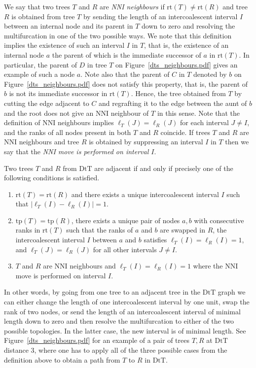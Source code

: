 \documentclass{amsart}
\newcommand{\mdts}{\mathrm{DtT}}
\newcommand{\rt}{\mathrm{rt}}
\newcommand{\tp}{\mathrm{tp}}
\begin{document}
We say that two trees $T$ and $R$ are {\em NNI neighbours} if $\rt(T) \ne \rt(R)$ and tree $R$ is obtained from tree $T$ by sending the length of an intercoalescent interval $I$ between an internal node and its parent in $T$ down to zero and resolving the multifurcation in one of the two possible ways.
We note that this definition implies the existence of such an interval $I$ in $T$, that is, the existence of an internal node $a$ the parent of which is the immediate successor of $a$ in $\rt(T)$.
In particular, the parent of $D$ in tree $T$ on Figure~\ref{dts_neighbours.pdf} gives an example of such a node $a$.
Note also that the parent of $C$ in $T$ denoted by $b$ on Figure~\ref{dts_neighbours.pdf} does not satisfy this property, that is, the parent of $b$ is not its immediate successor in $\rt(T)$.
Hence, the tree obtained from $T$ by cutting the edge adjacent to $C$ and regrafting it to the edge between the aunt of $b$ and the root does not give an NNI neighbour of $T$ in this sense.
Note that the definition of NNI neighbours implies $\ell_T(J) = \ell_R(J)$ for each interval $J \ne I$, and the ranks of all nodes present in both $T$ and $R$ coincide.
If trees $T$ and $R$ are NNI neighbours and tree $R$ is obtained by suppressing an interval $I$ in $T$ then we say that the {\em NNI move is performed on interval $I$}.

Two trees $T$ and $R$ from $\mdts$ are adjacent if and only if precisely one of the following conditions is satisfied.
\begin{enumerate}[(1)]
\item $\rt(T) = \rt(R)$ and there exists a unique intercoalescent interval $I$ such that $|\ell_T(I) - \ell_R(I)| = 1$.
\item $\tp(T) = \tp(R)$, there exists a unique pair of nodes $a,b$ with consecutive ranks in $\rt(T)$ such that the ranks of $a$ and $b$ are swapped in $R$, the intercoalescent interval $I$ between $a$ and $b$ satisfies $\ell_T(I) = \ell_R(I) = 1$, and $\ell_T(J) = \ell_R(J)$ for all other intervals $J \ne I$.
\item $T$ and $R$ are NNI neighbours and $\ell_T(I) = \ell_R(I) = 1$ where the NNI move is performed on interval $I$.
\end{enumerate}

In other words, by going from one tree to an adjacent tree in the $\mdts$ graph we can either change the length of one intercoalescent interval by one unit, swap the rank of two nodes, or send the length of an intercoalescent interval of minimal length down to zero and then resolve the multifurcation to either of the two possible topologies.
In the latter case, the new interval is of minimal length.
See Figure~\ref{dts_neighbours.pdf} for an example of a pair of trees $T,R$ at $\mdts$ distance $3$, where one has to apply all of the three possible cases from the definition above to obtain a path from $T$ to $R$ in $\mdts$.
\end{document}
